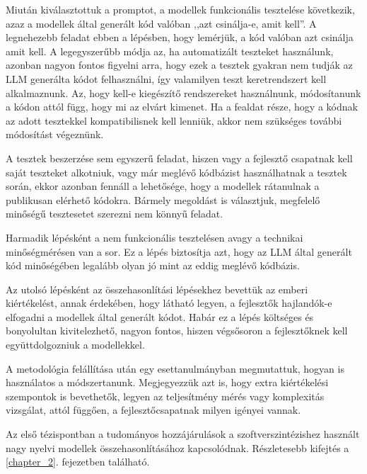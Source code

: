 Miután kiválasztottuk a promptot, a modellek funkcionális tesztelése következik, azaz a modellek által generált kód valóban ,,azt csinálja-e, amit kell''.
A legnehezebb feladat ebben a lépésben, hogy lemérjük, a kód valóban azt csinálja amit kell.
A legegyszerűbb módja az, ha automatizált teszteket használunk, azonban nagyon fontos figyelni arra, hogy ezek a tesztek gyakran nem tudják az LLM generálta kódot felhasználni, így valamilyen teszt keretrendszert kell alkalmaznunk.
Az, hogy kell-e kiegészítő rendszereket használnunk, módosítanunk a kódon attól függ, hogy mi az elvárt kimenet.
Ha a fealdat része, hogy a kódnak az adott tesztekkel kompatibilisnek kell lenniük, akkor nem szükséges további módosítást végeznünk.

A tesztek beszerzése sem egyszerű feladat, hiszen vagy a fejlesztő csapatnak kell saját teszteket alkotniuk, vagy már meglévő kódbázist használhatnak a tesztek során, ekkor azonban fennáll a lehetősége, hogy a modellek rátanulnak a publikusan elérhető kódokra.
Bármely megoldást is választjuk, megfelelő minőségű tesztesetet szerezni nem könnyű feladat.

Harmadik lépésként a nem funkcionális tesztelésen avagy a technikai mi\-nő\-ség\-mér\-és\-en van a sor.
Ez a lépés biztosítja azt, hogy az LLM által generált kód min\-ő\-ség\-é\-ben legalább olyan jó mint az eddig meglévő kódbázis.

Az utolsó lépésként az összehasonlítási lépésekhez bevettük az emberi kiértékelést, annak érdekében, hogy látható legyen, a fejlesztők hajlandók-e elfogadni a modellek által generált kódot.
Habár ez a lépés költséges és bonyolultan kivitelezhető, nagyon fontos, hiszen végsősoron a fejlesztőknek kell együttdolgozniuk a modellekkel.

A metodológia felállítása után egy esettanulmányban megmutattuk, hogyan is használatos a módszertanunk.
Megjegyezzük azt is, hogy extra kiértékelési szempontok is bevethetők, legyen az teljesítmény mérés vagy komplexitás vizsgálat, attól függően, a fejlesztőcsapatnak milyen igényei vannak.

\vspace*{1cm}
\noindent
Az első tézispontban a tudományos hozzájárulások a szoftverszintézishez használt nagy nyelvi modellek összehasonlításához kapcsolódnak.
Részletesebb kifejtés a \ref{chapter_2}. fejezetben található. 

